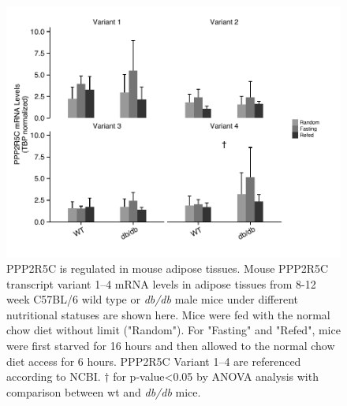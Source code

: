 \begin{figure}[!tb]
\centering
\includegraphics[width=1\textwidth]{figs/fig2-2 adipose ppp2r5c.pdf}
\caption[PPP2R5C expression in adipose tissues]{\footnotesize PPP2R5C is regulated in mouse adipose tissues. Mouse PPP2R5C transcript variant 1--4 mRNA levels in adipose tissues from 8-12 week C57BL/6 wild type or \textit{db/db} male mice under different nutritional statuses are shown here. Mice were fed with the normal chow diet without limit ("Random"). For "Fasting" and "Refed", mice were first starved for 16 hours and then allowed to the normal chow diet access for 6 hours. PPP2R5C Variant 1--4 are referenced according to NCBI. $\dagger$ for p-value<0.05 by \gls{ANOVA} analysis with comparison between wt and \textit{db/db} mice.}
\label{fig:fig2.2}
\end{figure}

